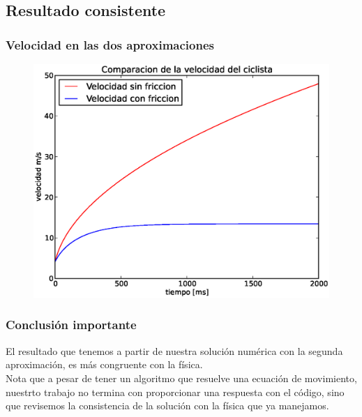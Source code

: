 \documentclass[12pt]{beamer}
\begin{document}
\subsection{Resultado consistente}

\begin{frame}
\frametitle{Velocidad en las dos aproximaciones}
\begin{figure}[H]
	\centering
	\includegraphics[scale=0.475]{Imagenes/EjerBicicleta02.eps}
\end{figure}
\end{frame}
\begin{frame}
\frametitle{Conclusión importante}
El resultado que tenemos a partir de nuestra solución numérica con la segunda aproximación, \textcolor{ao}{es más congruente con la física}.
\\
\bigskip
\pause
Nota que a pesar de tener un algoritmo que resuelve una ecuación de movimiento, nuestrto trabajo no termina con proporcionar una respuesta con el código, \pause sino que revisemos la consistencia de la solución con la física que ya manejamos.
\end{frame}
\end{document}
